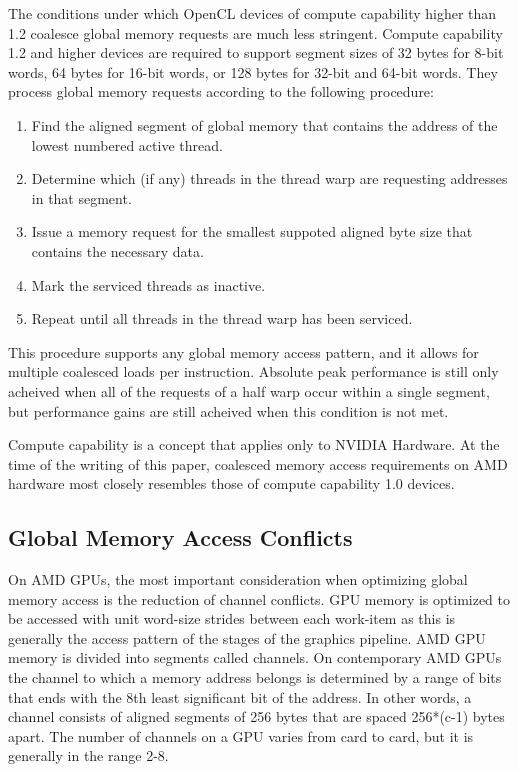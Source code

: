 \documentclass[12pt,twoside]{reedthesis}
\begin{document}
The conditions under which OpenCL devices of compute capability higher than 1.2 coalesce global memory requests are much less stringent.  Compute capability 1.2 and higher devices are required to support segment sizes of 32 bytes for 8-bit words, 64 bytes for 16-bit words, or 128 bytes for 32-bit and 64-bit words. They process global memory requests according to the following procedure:

\begin{enumerate}
\item Find the aligned segment of global memory that contains the address of the lowest numbered active thread.

\item Determine which (if any) threads in the thread warp are requesting addresses in that segment.

\item Issue a memory request for the smallest suppoted aligned byte size that contains the necessary data.

\item Mark the serviced threads as inactive.

\item Repeat until all threads in the thread warp has been serviced.
\end{enumerate}

This procedure supports any global memory access pattern, and it allows for multiple coalesced loads per instruction. Absolute peak performance is still only acheived when all of the requests of a half warp occur within a single segment, but performance gains are still acheived when this condition is not met.

Compute capability is a concept that applies only to NVIDIA Hardware. At the time of the writing of this paper, coalesced memory access requirements on AMD hardware most closely resembles those of compute capability 1.0 devices.

\subsection{Global Memory Access Conflicts}

On AMD GPUs, the most important consideration when optimizing global memory access is the reduction of channel conflicts. GPU memory is optimized to be accessed with unit word-size strides between each work-item as this is generally the access pattern of the stages of the graphics pipeline. AMD GPU memory is divided into segments called channels. On contemporary AMD GPUs the channel to which a memory address belongs is determined by a range of bits that ends with the 8th least significant bit of the address.  In other words, a channel consists of aligned segments of 256 bytes that are spaced 256*(c-1) bytes apart. The number of channels on a GPU varies from card to card, but it is generally in the range 2-8.
\end{document}
